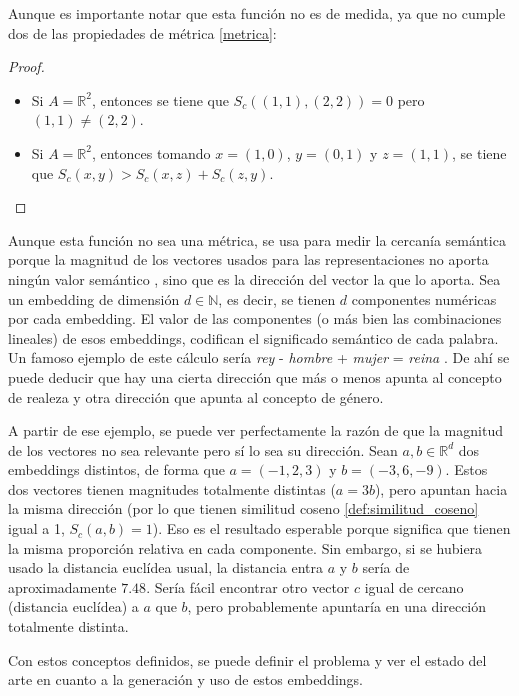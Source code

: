 Aunque es importante notar que esta función no es de medida, ya que no cumple dos de las propiedades de métrica \ref*{metrica}:
\begin{proof}
    $ $
    \begin{itemize}
    \item Si $A=\mathbb{R}^2$, entonces se tiene que $S_c\left( (1,1), (2,2) \right) = 0$ pero $(1,1)\neq (2,2)$.
    \item Si $A=\mathbb{R}^2$, entonces tomando $x=(1,0)$, $y=(0,1)$ y $z=(1,1)$, se tiene que $S_c\left( x, y \right) > S_c(x,z) + S_c(z,y)$.
    \end{itemize}
\end{proof}

Aunque esta función no sea una métrica, se usa para medir la cercanía semántica porque la magnitud de los vectores usados para las representaciones no aporta
ningún valor semántico \cite{landauer1997learning}, sino que es la dirección del vector la que lo aporta. Sea un embedding de dimensión $d\in\mathbb{N}$, es decir,
se tienen $d$ componentes numéricas por cada embedding. El valor de las componentes (o más bien las combinaciones lineales) de esos embeddings,
codifican el significado semántico de cada palabra. Un famoso ejemplo de este cálculo sería \emph{rey} - \emph{hombre} + \emph{mujer} = \emph{reina} \cite{drozd-etal-2016-word}.
De ahí se puede deducir que hay una cierta dirección que más o menos apunta al concepto de realeza y otra dirección que apunta al concepto de género.

A partir de ese ejemplo, se puede ver perfectamente la razón de que la magnitud de los vectores no sea relevante pero sí lo sea su dirección. Sean $a,b\in\mathbb{R}^d$ dos embeddings
distintos, de forma que $a=(-1, 2, 3)$ y $b=(-3, 6, -9)$. Estos dos vectores tienen magnitudes totalmente distintas ($a=3b$), pero apuntan hacia la misma dirección
(por lo que tienen similitud coseno \ref{def:similitud_coseno} igual a 1, $S_c(a,b)=1$). Eso es el resultado esperable porque significa que tienen la misma proporción relativa en cada componente.
Sin embargo, si se hubiera usado la distancia euclídea usual, la distancia entra $a$ y $b$ sería de aproximadamente $7.48$. Sería fácil encontrar otro vector $c$ igual de cercano (distancia euclídea) a $a$
que $b$, pero probablemente apuntaría en una dirección totalmente distinta.

Con estos conceptos definidos, se puede definir el problema y ver el estado del arte en cuanto a la generación y uso de estos embeddings.